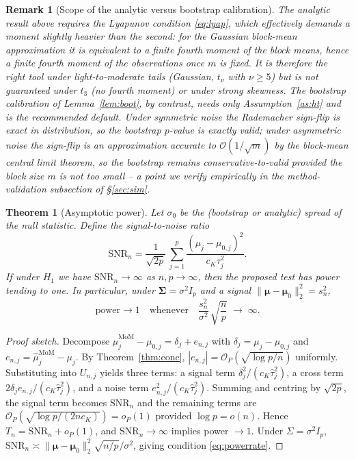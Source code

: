 \documentclass[pdflatex,sn-mathphys-num]{sn-jnl}
\newcommand{\bmu}{\boldsymbol{\mu}}
\newcommand{\bSig}{\boldsymbol{\Sigma}}
\newcommand{\normt}[1]{\lVert #1 \rVert_2}
\theoremstyle{thmstyleone}%
\newtheorem{theorem}{Theorem}%
\theoremstyle{thmstyletwo}%
\newtheorem{remark}{Remark}%
\theoremstyle{thmstylethree}%
\begin{document}
\begin{remark}[Scope of the analytic versus bootstrap calibration]
\label{rem:scope}
The analytic result above requires the Lyapunov condition \eqref{eq:lyap}, which
effectively demands a moment slightly heavier than the second: for the Gaussian
block-mean approximation it is equivalent to a finite fourth moment of the block
means, hence a finite fourth moment of the observations once $m$ is fixed. It is
therefore the \emph{right} tool under light-to-moderate tails (Gaussian,
$t_\nu$ with $\nu\ge 5$) but is \emph{not} guaranteed under $t_3$ (no fourth
moment) or under strong skewness. The bootstrap calibration of
Lemma~\ref{lem:boot}, by contrast, needs only Assumption~\ref{as:ht} and is the
recommended default. Under \emph{symmetric} noise the Rademacher sign-flip is
exact in distribution, so the bootstrap $p$-value is exactly valid; under
\emph{asymmetric} noise the sign-flip is an approximation accurate to
$\mathcal{O}(1/\sqrt{m})$ by the block-mean central limit theorem, so the
bootstrap remains conservative-to-valid provided the block size $m$ is not too
small -- a point we verify empirically in the method-validation subsection of
\S\ref{sec:sim}.
\end{remark}

\begin{theorem}[Asymptotic power]
\label{thm:power}
Let $\sigma_0$ be the (bootstrap or analytic) spread of the null statistic.
Define the signal-to-noise ratio
\begin{equation}
\label{eq:snr}
\mathrm{SNR}_n
 = \frac{1}{\sqrt{2p}}\,
   \sum_{j=1}^p \frac{(\mu_j-\mu_{0,j})^2}{c_K\tau_j^2}.
\end{equation}
If under $H_1$ we have $\mathrm{SNR}_n\to\infty$ as $n,p\to\infty$, then the
proposed test has power tending to one. In particular, under
$\bSig=\sigma^2 I_p$ and a signal $\normt{\bmu-\bmu_0}^2=s_n^2$,
\begin{equation}
\label{eq:powerrate}
\mathrm{power}\to 1
\quad\text{whenever}\quad
\frac{s_n^2}{\sigma^2}\,\sqrt{\frac{n}{p}}\;\to\;\infty.
\end{equation}
\end{theorem}
\begin{proof}[Proof sketch]
Decompose $\hat\mu^{\mathrm{MoM}}_j-\mu_{0,j}=\delta_j+e_{n,j}$ with
$\delta_j=\mu_j-\mu_{0,j}$ and $e_{n,j}=\hat\mu^{\mathrm{MoM}}_j-\mu_j$.
By Theorem~\ref{thm:conc}, $|e_{n,j}|=\mathcal{O}_P(\sqrt{\log p/n})$ uniformly.
Substituting into $U_{n,j}$ yields three terms: a signal term
$\delta_j^2/(c_K\hat\tau_j^2)$, a cross term
$2\delta_j e_{n,j}/(c_K\hat\tau_j^2)$, and a noise term
$e_{n,j}^2/(c_K\hat\tau_j^2)$. Summing and centring by $\sqrt{2p}$, the signal
term becomes $\mathrm{SNR}_n$ and the remaining terms are
$\mathcal{O}_P(\sqrt{\log p/(2n c_K)})=o_P(1)$ provided $\log p=o(n)$.
Hence $T_n=\mathrm{SNR}_n+o_P(1)$, and $\mathrm{SNR}_n\to\infty$ implies
power $\to 1$. Under $\Sigma=\sigma^2 I_p$,
$\mathrm{SNR}_n \asymp \normt{\bmu-\bmu_0}^2 \sqrt{n/p}/\sigma^2$,
giving condition \eqref{eq:powerrate}.
\end{proof}
\end{document}
